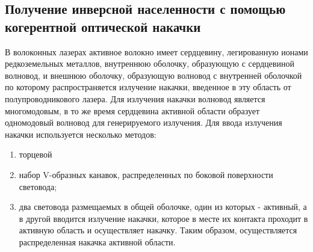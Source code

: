 \documentclass[a4paper, 12pt]{article}
\begin{document}
	\subsection{Получение инверсной населенности с помощью когерентной оптической накачки}
	В волоконных лазерах активное волокно имеет сердцевину, легированную ионами редкоземельных металлов, внутреннюю оболочку, образующую с сердцевиной волновод, и внешнюю оболочку, образующую волновод с внутренней оболочкой по которому распространяется излучение накачки, введенное в эту область от полупроводникового лазера. Для излучения накачки волновод является многомодовым, в то же время сердцевина активной области образует одномодовый волновод для генерируемого излучения. Для ввода излучения накачки используется несколько методов:
	\begin{enumerate}
		\item торцевой
		\item набор V-образных канавок, распределенных по боковой поверхности световода;
		\item два световода размещаемых в общей оболочке, один из которых - активный, а в другой вводится излучение накачки, которое в месте их контакта проходит в активную область и осуществляет накачку. Таким образом, осуществляется распределенная накачка активной области.
	\end{enumerate}
\end{document}
